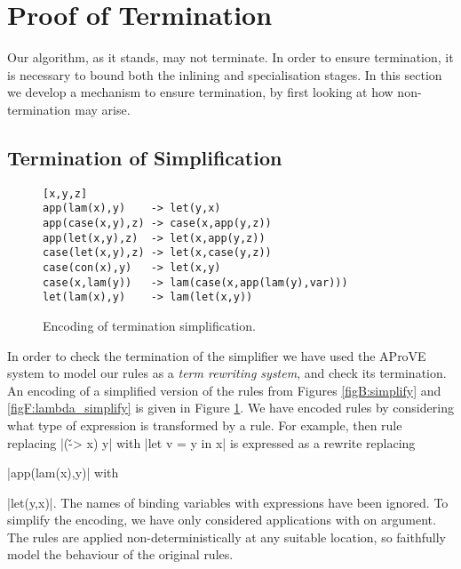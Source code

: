 \section{Proof of Termination}
\label{secF:termination}

\begin{comment}
We can remove all data types by encoding them as functions, as described in \citet{naylor:reduceron}. If we then had a transformation which made the program first-order \textit{without} introducing any data types, we would end up with a program without data or closures, which is incapable of storing an unbounded amount of information. Since with higher-order functions we can implement a Turing machine \cite{turing:halting}, and without an unbounded store we cannot, such a transformation cannot exist.
\end{comment}

Our algorithm, as it stands, may not terminate. In order to ensure termination, it is necessary to bound both the inlining and specialisation stages. In this section we develop a mechanism to ensure termination, by first looking at how non-termination may arise.

\subsection{Termination of Simplification}
\label{secF:termination_simplification}

\begin{figure}
\bigskip
\begin{verbatim}
[x,y,z]
app(lam(x),y)    -> let(y,x)
app(case(x,y),z) -> case(x,app(y,z))
app(let(x,y),z)  -> let(x,app(y,z))
case(let(x,y),z) -> let(x,case(y,z))
case(con(x),y)   -> let(x,y)
case(x,lam(y))   -> lam(case(x,app(lam(y),var)))
let(lam(x),y)    -> lam(let(x,y))
\end{verbatim}
\bigskip
\caption{Encoding of termination simplification.}
\label{figF:term_simplification}
\end{figure}

In order to check the termination of the simplifier we have used the AProVE system \cite{aprove} to model our rules as a \textit{term rewriting system}, and check its termination. An encoding of a simplified version of the rules from Figures \ref{figB:simplify} and \ref{figF:lambda_simplify} is given in Figure \ref{figF:term_simplification}. We have encoded rules by considering what type of expression is transformed by a rule. For example, then rule replacing |(\v -> x) y| with |let v = y in x| is expressed as a rewrite replacing \ignore|app(lam(x),y)| with \ignore|let(y,x)|. The names of binding variables with expressions have been ignored. To simplify the encoding, we have only considered applications with on argument. The rules are applied non-deterministically at any suitable location, so faithfully model the behaviour of the original rules.

